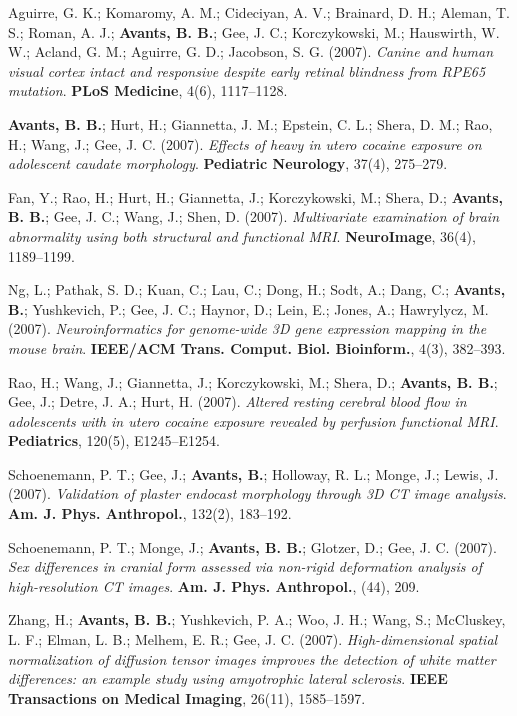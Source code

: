 \documentclass[10pt,letterpaper]{article}
\begin{document}
\begin{enumerate}
{  %
  \item Aguirre, G. K.; Komaromy, A. M.; Cideciyan, A. V.; Brainard, D. H.; Aleman, T. S.; Roman, A. J.; \textbf{Avants, B. B.}; Gee, J. C.; Korczykowski, M.; Hauswirth, W. W.; Acland, G. M.; Aguirre, G. D.; Jacobson, S. G. (2007). \textit{Canine and human visual cortex intact and responsive despite early retinal blindness from RPE65 mutation}. \textbf{PLoS Medicine}, 4(6), 1117--1128.
  \item \textbf{Avants, B. B.}; Hurt, H.; Giannetta, J. M.; Epstein, C. L.; Shera, D. M.; Rao, H.; Wang, J.; Gee, J. C. (2007). \textit{Effects of heavy in utero cocaine exposure on adolescent caudate morphology}. \textbf{Pediatric Neurology}, 37(4), 275--279.
  \item Fan, Y.; Rao, H.; Hurt, H.; Giannetta, J.; Korczykowski, M.; Shera, D.; \textbf{Avants, B. B.}; Gee, J. C.; Wang, J.; Shen, D. (2007). \textit{Multivariate examination of brain abnormality using both structural and functional MRI}. \textbf{NeuroImage}, 36(4), 1189--1199.
  \item Ng, L.; Pathak, S. D.; Kuan, C.; Lau, C.; Dong, H.; Sodt, A.; Dang, C.; \textbf{Avants, B.}; Yushkevich, P.; Gee, J. C.; Haynor, D.; Lein, E.; Jones, A.; Hawrylycz, M. (2007). \textit{Neuroinformatics for genome-wide 3D gene expression mapping in the mouse brain}. \textbf{IEEE/ACM Trans. Comput. Biol. Bioinform.}, 4(3), 382--393.
  \item Rao, H.; Wang, J.; Giannetta, J.; Korczykowski, M.; Shera, D.; \textbf{Avants, B. B.}; Gee, J.; Detre, J. A.; Hurt, H. (2007). \textit{Altered resting cerebral blood flow in adolescents with in utero cocaine exposure revealed by perfusion functional MRI}. \textbf{Pediatrics}, 120(5), E1245--E1254.
  \item Schoenemann, P. T.; Gee, J.; \textbf{Avants, B.}; Holloway, R. L.; Monge, J.; Lewis, J. (2007). \textit{Validation of plaster endocast morphology through 3D CT image analysis}. \textbf{Am. J. Phys. Anthropol.}, 132(2), 183--192.
  \item Schoenemann, P. T.; Monge, J.; \textbf{Avants, B. B.}; Glotzer, D.; Gee, J. C. (2007). \textit{Sex differences in cranial form assessed via non-rigid deformation analysis of high-resolution CT images}. \textbf{Am. J. Phys. Anthropol.}, (44), 209.
  \item Zhang, H.; \textbf{Avants, B. B.}; Yushkevich, P. A.; Woo, J. H.; Wang, S.; McCluskey, L. F.; Elman, L. B.; Melhem, E. R.; Gee, J. C. (2007). \textit{High-dimensional spatial normalization of diffusion tensor images improves the detection of white matter differences: an example study using amyotrophic lateral sclerosis}. \textbf{IEEE Transactions on Medical Imaging}, 26(11), 1585--1597.
}
\end{enumerate}
\end{document}
